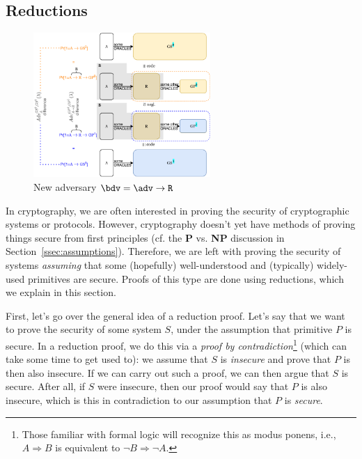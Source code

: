 \subsection{Reductions}

\begin{figure}
      \vspace{-0.5cm}
      \begin{center}
            \includegraphics[width=0.6\textwidth]{figs/reduction}
            \caption{\label{fig:reduction-example}New adversary $\bdv=\adv\circ\M{R}$}
      \end{center}
      \vspace{-0.5cm}
\end{figure}

In cryptography, we are often interested in proving the security of cryptographic systems or protocols. However, cryptography doesn't yet have methods of proving things secure from first principles (cf. the \textbf{P} vs. \textbf{NP} discussion in Section~\ref{ssec:assumptions}). Therefore, we are left with proving the security of systems \emph{assuming} that some (hopefully) well-understood and (typically) widely-used primitives are secure. Proofs of this type are done using reductions, which we explain in this section.

First, let's go over the general idea of a reduction proof.
Let's say that we want to prove the security of some system $S$, under the assumption that primitive $P$ is secure. In a reduction proof, we do this via a \emph{proof by contradiction}\footnote{Those familiar with formal logic will recognize this as modus ponens, i.e., $A\Rightarrow B$ is equivalent to $\neg B\Rightarrow \neg A$.} (which can take some time to get used to): we assume that $S$ is \emph{insecure} and prove that $P$ is then also insecure. If we can carry out such a proof, we can then argue that $S$ is secure. After all, if $S$ were insecure, then our proof would say that $P$ is also insecure, which is this in contradiction to our assumption that $P$ is \emph{secure}.


